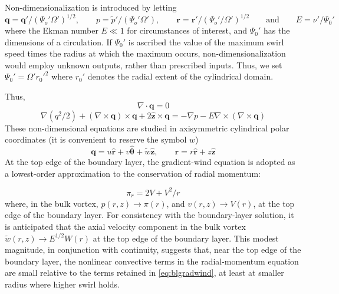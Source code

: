 \documentclass[preprint, prX]{revtex4}
\newcommand{\vhat}[1]{\hat{\bm{#1}}}
\begin{document}
Non-dimensionalization is introduced by letting
\begin{equation}
\mathbf{q}=\mathbf{q'}/(\Psi_o' \Omega')^{1/2}, \qquad p=\tilde{p}' /(\Psi_o' \Omega'), \qquad \mathbf{r} = \mathbf{r'}/(\Psi_o'/\Omega')^{1/2} \qquad \text{and} \qquad E = \nu' / \Psi_0'
\label{eq:bl3}
\end{equation}
where the Ekman number $E \ll 1$ for circumstances of interest, and $\Psi_0'$ has the
dimensions of a circulation. If $\Psi_0'$ is ascribed the value of the maximum swirl speed times the radius at which the maximum occurs, non-dimensionalization would employ unknown outputs, rather than prescribed inputs. Thus, we set $\Psi_0' = \Omega' r_0'^2$ where $r_0'$ denotes the radial extent of the cylindrical domain.

Thus,
\begin{equation}
\nabla \cdot \mathbf{q}=0
\label{eq:blcon}
\end{equation}
\begin{equation}
\nabla(q^2/2) +(\nabla \times \mathbf{q})\times \mathbf{q} + 2 \vhat{z} \times \mathbf{q}=-\nabla p - E \nabla \times (\nabla \times \mathbf{q})
\label{eq:blradmom}
\end{equation}
These non-dimensional equations are studied in axisymmetric cylindrical polar coordinates (it is convenient to reserve the symbol $w$)
\begin{equation}
\mathbf{q} = u \vhat{r} + v \vhat{\theta} +\tilde{w}\vhat{z}, \qquad \bm{r} = r \vhat{r} + z \vhat{z}
\end{equation}
At the top edge of the boundary layer, the gradient-wind equation is adopted as a lowest-order approximation to the conservation of radial momentum:

\begin{equation}
\pi_r = 2 V + V^2 /r
\label{eq:blgradwind}
\end{equation}
where, in the bulk vortex, $p(r, z) \rightarrow \pi(r)$, and $v(r, z) \rightarrow V(r)$, at the top edge of the boundary layer. For consistency with the boundary-layer solution, it is anticipated that the axial velocity component in the bulk vortex $\tilde{w}(r,z) \rightarrow E^{1/2} W(r)$ at the top edge of the boundary layer. This modest magnitude, in conjunction with continuity, suggests that, near the top edge of the boundary layer, the nonlinear convective terms in the radial-momentum equation are small relative to the terms retained in \eqref{eq:blgradwind}, at least at smaller radius where higher swirl holds.
\end{document}
